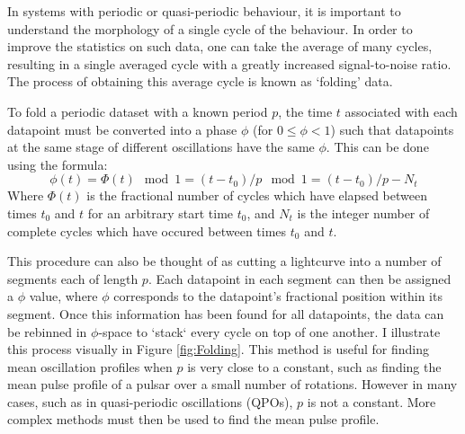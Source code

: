 \label{sec:normfold}

\par In systems with periodic or quasi-periodic behaviour, it is important to understand the morphology of a single cycle of the behaviour.  In order to improve the statistics on such data, one can take the average of many cycles, resulting in a single averaged cycle with a greatly increased signal-to-noise ratio.  The process of obtaining this average cycle is known as `folding' data.
\par To fold a periodic dataset with a known period $p$, the time $t$ associated with each datapoint must be converted into a phase $\phi$ (for $0\leq\phi<1$) such that datapoints at the same stage of different oscillations have the same $\phi$.  This can be done using the formula:
\begin{equation}
\phi(t)=\Phi(t)\mod1=(t-t_0)/p\mod1=(t-t_0)/p-N_t
\label{eq:simfold}
\end{equation}
Where $\Phi(t)$ is the fractional number of cycles which have elapsed between times $t_0$ and $t$ for an arbitrary start time $t_0$, and $N_t$ is the integer number of complete cycles which have occured between times $t_0$ and $t$.
\par This procedure can also be thought of as cutting a lightcurve into a number of segments each of length $p$.  Each datapoint in each segment can then be assigned a $\phi$ value, where $\phi$ corresponds to the datapoint's fractional position within its segment.  Once this information has been found for all datapoints, the data can be rebinned in $\phi$-space to `stack` every cycle on top of one another.  I illustrate this process visually in Figure \ref{fig:Folding}.  This method is useful for finding mean oscillation profiles when $p$ is very close to a constant, such as finding the mean pulse profile of a pulsar over a small number of rotations.  However in many cases, such as in quasi-periodic oscillations (QPOs), $p$ is not a constant.  More complex methods must then be used to find the mean pulse profile.

